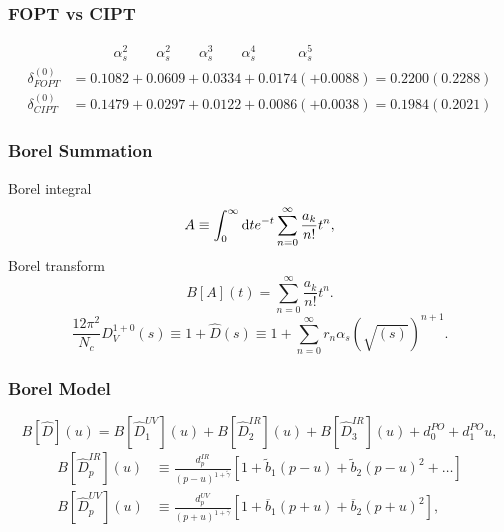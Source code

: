 \documentclass[fleqn]{beamer}
\begin{document}
\begin{frame}
  \frametitle{FOPT vs CIPT}
  \begin{footnotesize}
    \begin{align}
      & \quad\qquad \alpha_s^2 \qquad \alpha_s^2 \qquad \alpha_s^3 \qquad \alpha_s^4 \quad\qquad \alpha_s^5 \nonumber\\
      \delta_{FOPT}^{(0)} &= 0.1082 + 0.0609 + 0.0334 + 0.0174 (+ 0.0088) = 0.2200 (0.2288) \\
      \delta_{CIPT}^{(0)} &= 0.1479 + 0.0297 + 0.0122 + 0.0086 (+ 0.0038) = 0.1984 (0.2021)
    \end{align}
  \end{footnotesize}
\end{frame}

\begin{frame}
  \frametitle{Borel Summation}
  Borel integral
  \begin{equation}
    A \equiv \int_0^\infty \dif t e^{-t} \sum_{n=0}^\infty \frac{a_k}{n!} t^n,
  \end{equation}
  Borel transform
  \begin{equation}
    B[A](t) = \sum_{n=0}^\infty \frac{a_k}{n!} t^n.
  \end{equation}
  \begin{equation}
    \frac{12 \pi^2}{N_c} D_V^{1+0}(s) \equiv 1 + \widehat D(s) \equiv 1 + \sum_{n=0}^{\infty} r_n \alpha_s(\sqrt{(s)})^{n+1}.
  \end{equation}
\end{frame}
\begin{frame}
  \frametitle{Borel Model}
  \begin{equation}
    \label{eq:borelModel}
    B[\widehat D](u) = B[\widehat D_1^{UV}](u) + B[\widehat D_2^{IR}](u) + B[\widehat D_3^{IR}](u) + d_0^{PO} + d_1^{PO}u,
  \end{equation}
  \begin{align}
    B[\widehat D_p^{IR}](u)
    &\equiv \frac{d_p^{IR}}{(p-u)^{1+\widetilde \gamma}}
      \left[  1 + \widetilde b_1(p-u) + \widetilde b_2(p-u)^2 + \dots \right] \\
    B[\widehat D_p^{UV}](u) &\equiv \frac{d_p^{UV}}{(p+u)^{1+\overline\gamma}}\left[1 + \overline b_1(p+u) + \overline b_2(p+u)^2 \right],
  \end{align}
  \cite{Beneke2008}
\end{frame}
\end{document}
